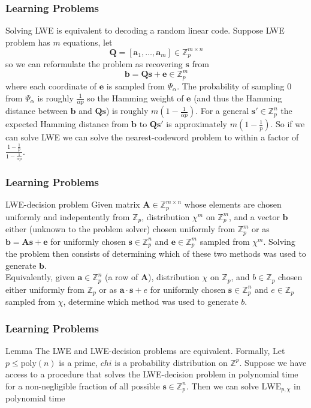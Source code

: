 \documentclass{beamer}
\renewcommand{\v}{\mathbf}
\begin{document}
\begin{frame}
\frametitle{Learning Problems}
Solving LWE is equivalent to decoding a random linear code.
Suppose LWE problem has $m$ equations, let 
\[
    \v{Q} = [\v{a}_1,\ldots,\v{a}_m] \in \mathbb{Z}^{m\times n}_p
\]
so we can reformulate the problem as recovering $\v{s}$ from
\[
    \v{b} = \v{Qs+e} \in \mathbb{Z}_p^m
\]
where each coordinate of $\v{e}$ is sampled from $\Psi_\alpha$.
The probability of sampling 0 from $\Psi_\alpha$ is roughly $\frac{1}{\alpha p}$
so the Hamming weight of $\v{e}$ (and thus the Hamming distance 
between $\v{b}$ and $\v{Qs}$) 
is roughly 
$m\left(1-\frac{1}{\alpha p}\right)$. 
For a general $\v{s}' \in \mathbb{Z}_p^n$ the expected Hamming distance
from $\v{b}$ to $\v{Qs}'$ is approximately $m\left(1-\frac{1}{p}\right)$.
So if we can solve LWE we can solve the nearest-codeword problem
to within a factor of $\frac{1-\frac{1}{p}}{1-\frac{1}{\alpha p}}$.
\end{frame}

\begin{frame}
\frametitle{Learning Problems}
\begin{block}{LWE-decision problem}
Given matrix $\v{A} \in \mathbb{Z}_p^{m \times n}$
whose elements are chosen uniformly and indepentently from $\mathbb{Z}_p$, distribution $\chi^m$ on $\mathbb{Z}_p^m$,
and a vector $\v{b}$ either (unknown to the problem solver) chosen
uniformly from $\mathbb{Z}_p^m$ or as $\v{b} = \v{A}\v{s} + \v{e}$
for uniformly chosen $\v{s} \in \mathbb{Z}_p^n$ and $\v{e} \in \mathbb{Z}_p^m$ sampled from $\chi^m$. 
Solving the problem then consists of determining
which of these two methods was used to generate $\v{b}$.
\bigskip \\
Equivalently, given $\v{a} \in \mathbb{Z}_p^n$ (a row of $\v{A}$),
distribution $\chi$ on $\mathbb{Z}_p$, and $b \in \mathbb{Z}_p$
chosen either uniformly from $\mathbb{Z}_p$ or as 
$\v{a} \cdot \v{s} + e$ for uniformly chosen $\v{s} \in \mathbb{Z}_p^n$
and $e \in \mathbb{Z}_p$ sampled from $\chi$, determine which method
was used to generate $b$.
\end{block}
\end{frame}

\begin{frame}
\frametitle{Learning Problems}
\begin{block}{Lemma}
The LWE and LWE-decision problems are equivalent. Formally,
Let $p \leq \text{poly}(n)$ is a prime, $chi$ is a probability distribution on
$\mathbb{Z}^p$. Suppose we have access to a procedure that solves the LWE-decision
problem in polynomial time for a non-negligible fraction of all possible $\v{s} \in
\mathbb{Z}_p^n$. Then we can solve $\text{LWE}_{p,\chi}$ in polynomial
time
\end{block}
\end{frame}
\end{document}
